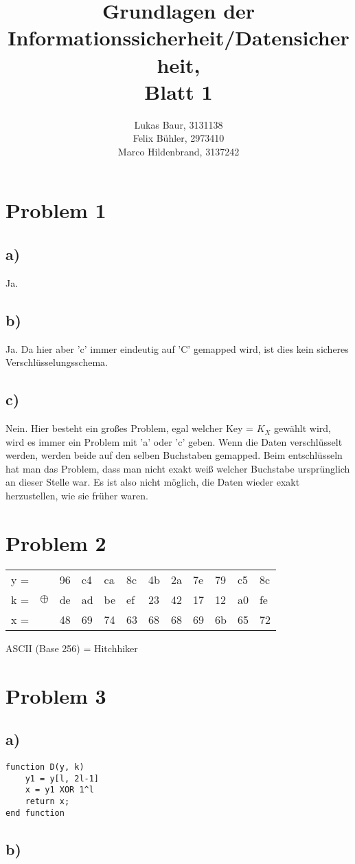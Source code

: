 \documentclass[12pt,pdftex,a4paper]{article}
\begin{document}
\title{ Grundlagen der Informationssicherheit/Datensicherheit,\\ Blatt 1}
\author{Lukas Baur, 3131138\\
		Felix Bühler, 2973410\\
		Marco Hildenbrand, 3137242}
\maketitle
\section*{Problem 1}
\subsection*{a)}
Ja.
\subsection*{b)}
Ja. Da hier aber 'c' immer eindeutig auf 'C' gemapped wird, ist dies kein sicheres Verschlüsselungsschema.
\subsection*{c)}
Nein. Hier besteht ein großes Problem, egal welcher Key = $ K_X $ gewählt wird, wird es immer ein Problem mit 'a' oder 'c' geben. Wenn die Daten verschlüsselt werden, werden beide auf den selben Buchstaben gemapped. Beim entschlüsseln hat man das Problem, dass man nicht exakt weiß welcher Buchstabe ursprünglich an dieser Stelle war. Es ist also nicht möglich, die Daten wieder exakt herzustellen, wie sie früher waren.

\section*{Problem 2}
\begin{table}[!ht]
	\centering
	\begin{tabular}{llllllllllll}
		y = &  & 96 & c4 & ca & 8c & 4b & 2a & 7e & 79 & c5 & 8c \\
		k = & $ \oplus $ & de & ad & be & ef & 23 & 42 & 17 & 12 & a0 & fe \\ \hline
		x = &  & 48 & 69 & 74 & 63 & 68 & 68 & 69 & 6b & 65 & 72
	\end{tabular}
\end{table}
ASCII (Base 256) = Hitchhiker

\section*{Problem 3}
\subsection*{a)}
\begin{lstlisting}
function D(y, k)
	y1 = y[l, 2l-1]
	x = y1 XOR 1^l
	return x;
end function
\end{lstlisting}

\subsection*{b)}
\end{document}
